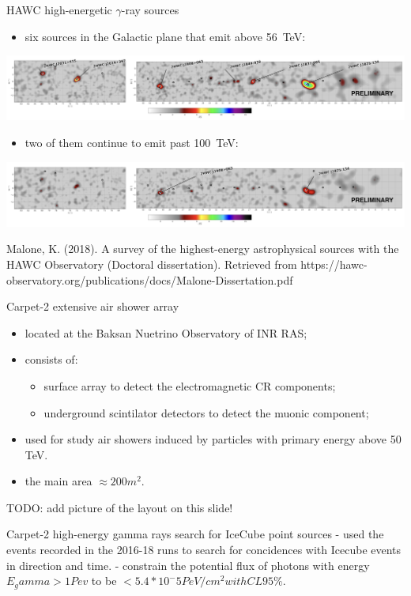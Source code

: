 \begin{frame}{HAWC high-energetic $\gamma$-ray sources}

\begin{itemize}
  \item six sources in the Galactic plane that emit above 56~TeV:
\end{itemize}
\includegraphics[width=1\textwidth]{pics/HWC_above_56TeV.png}
\begin{itemize}
  \item two of them continue to emit past 100~TeV:
\end{itemize}
\includegraphics[width=1\textwidth]{pics/HWC_above_100TeV.png}

Malone, K. (2018). A survey of the highest-energy astrophysical sources with the HAWC Observatory (Doctoral dissertation).
Retrieved from https://hawc-observatory.org/publications/docs/Malone-Dissertation.pdf

\end{frame}

\begin{frame}{Carpet-2 extensive air shower array}
\begin{itemize}
 \item located at the Baksan Nuetrino Observatory of INR RAS;
 \item consists of:
 \begin{itemize}
  \item surface array to detect the electromagnetic CR components;
  \item underground scintilator detectors to detect the muonic component;
 \end{itemize}
\item used for study air showers induced by particles with primary energy above 50 TeV.
\item the main area $\approx 200 m^2$.
\end{itemize}

TODO: add picture of the layout on this slide!
\end{frame}

\begin{frame}{Carpet-2 high-energy gamma rays search for IceCube point sources}
- used the events recorded in the 2016-18 runs to search for concidences with Icecube events in direction and time.
- constrain the potential flux of photons with energy $E_gamma > 1 Pev$ to be $< 5.4 * 10^-5 PeV/cm^2 with CL 95\%$.
\end{frame}
